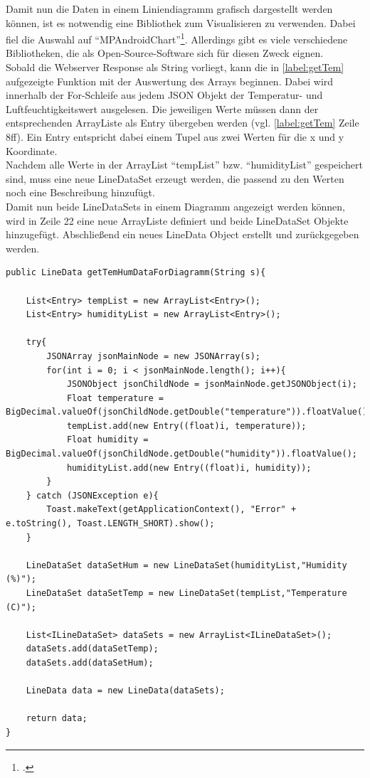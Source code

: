 Damit nun die Daten in einem Liniendiagramm grafisch dargestellt werden können, ist es notwendig eine Bibliothek zum Visualisieren zu verwenden. Dabei fiel die Auswahl auf \enquote{MPAndroidChart}\footcite{https://github.com/PhilJay/MPAndroidChart}. Allerdings gibt es viele verschiedene Bibliotheken, die als Open-Source-Software sich für diesen Zweck eignen.\\
Sobald die Webserver Response als String vorliegt, kann die in \autoref{label:getTem} aufgezeigte Funktion mit der Auswertung des Arrays beginnen. Dabei wird innerhalb der For-Schleife aus jedem \ac{JSON} Objekt der Temperatur- und Luftfeuchtigkeitswert ausgelesen. Die jeweiligen Werte müssen dann der entsprechenden ArrayListe als Entry übergeben werden (vgl. \autoref{label:getTem} Zeile 8ff). Ein Entry entspricht dabei einem Tupel aus zwei Werten für die x und y Koordinate.\\Nachdem alle Werte in der ArrayList \enquote{tempList} bzw. \enquote{humidityList} gespeichert sind, muss eine neue LineDataSet erzeugt werden, die passend zu den Werten noch eine Beschreibung hinzufügt. \\
Damit nun beide LineDataSets in einem Diagramm angezeigt werden können, wird in Zeile 22 eine neue ArrayListe definiert und beide LineDataSet Objekte hinzugefügt. Abschließend ein neues LineData Object erstellt und zurückgegeben werden. 

\begin{lstlisting}[label=label:getTem]
public LineData getTemHumDataForDiagramm(String s){

	List<Entry> tempList = new ArrayList<Entry>();
	List<Entry> humidityList = new ArrayList<Entry>();
	
	try{
		JSONArray jsonMainNode = new JSONArray(s);
		for(int i = 0; i < jsonMainNode.length(); i++){
			JSONObject jsonChildNode = jsonMainNode.getJSONObject(i);
			Float temperature = BigDecimal.valueOf(jsonChildNode.getDouble("temperature")).floatValue();
			tempList.add(new Entry((float)i, temperature));
			Float humidity = BigDecimal.valueOf(jsonChildNode.getDouble("humidity")).floatValue();
			humidityList.add(new Entry((float)i, humidity));
		}
	} catch (JSONException e){
		Toast.makeText(getApplicationContext(), "Error" + e.toString(), Toast.LENGTH_SHORT).show();
	}
	
	LineDataSet dataSetHum = new LineDataSet(humidityList,"Humidity (%)");	
	LineDataSet dataSetTemp = new LineDataSet(tempList,"Temperature (C)");
		
	List<ILineDataSet> dataSets = new ArrayList<ILineDataSet>();
	dataSets.add(dataSetTemp);
	dataSets.add(dataSetHum);
	
	LineData data = new LineData(dataSets);
	
	return data;
}
\end{lstlisting}

